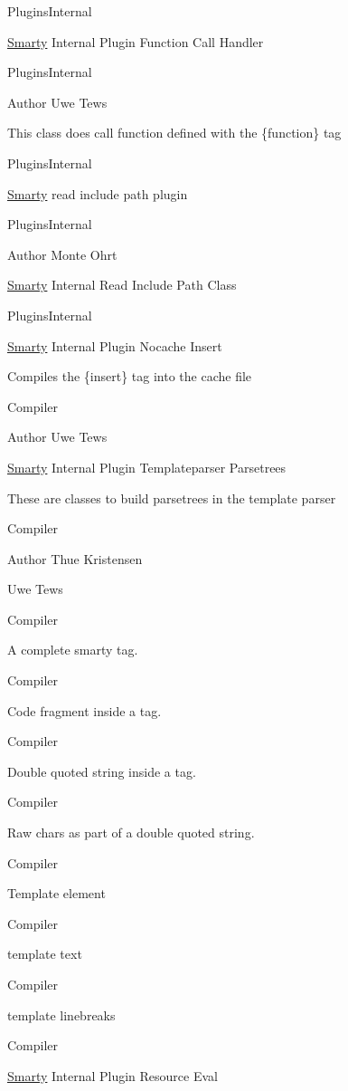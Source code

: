 Plugins\+Internal

\hyperlink{class_smarty}{Smarty} Internal Plugin Function Call Handler

Plugins\+Internal \begin{DoxyAuthor}{Author}
Uwe Tews
\end{DoxyAuthor}
This class does call function defined with the \{function\} tag

Plugins\+Internal

\hyperlink{class_smarty}{Smarty} read include path plugin

Plugins\+Internal \begin{DoxyAuthor}{Author}
Monte Ohrt
\end{DoxyAuthor}
\hyperlink{class_smarty}{Smarty} Internal Read Include Path Class

Plugins\+Internal

\hyperlink{class_smarty}{Smarty} Internal Plugin Nocache Insert

Compiles the \{insert\} tag into the cache file

Compiler \begin{DoxyAuthor}{Author}
Uwe Tews
\end{DoxyAuthor}
\hyperlink{class_smarty}{Smarty} Internal Plugin Templateparser Parsetrees

These are classes to build parsetrees in the template parser

Compiler \begin{DoxyAuthor}{Author}
Thue Kristensen 

Uwe Tews
\end{DoxyAuthor}
Compiler 

A complete smarty tag.

Compiler 

Code fragment inside a tag.

Compiler 

Double quoted string inside a tag.

Compiler 

Raw chars as part of a double quoted string.

Compiler 

Template element

Compiler 

template text

Compiler 

template linebreaks

Compiler 

\hyperlink{class_smarty}{Smarty} Internal Plugin Resource Eval

